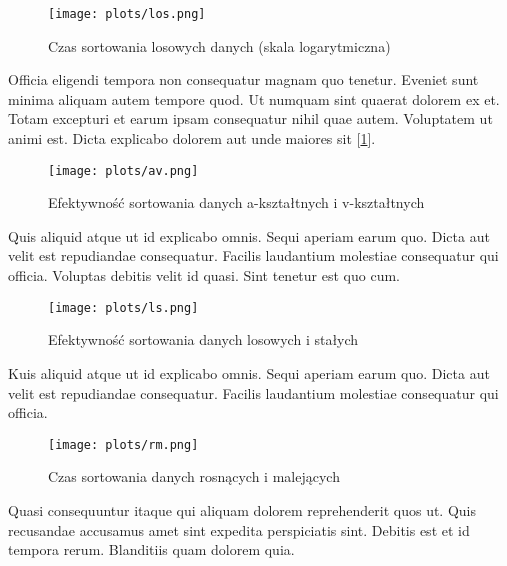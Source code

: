 \documentclass[10pt,twocolumn]{article}
\begin{document}
\begin{figure}
	\texttt{[image: plots/los.png]}
	\caption{Czas sortowania losowych danych (skala logarytmiczna) \label{los_log}}
\end{figure}

Officia eligendi tempora non consequatur magnam quo tenetur. Eveniet sunt minima aliquam autem tempore quod. Ut numquam sint quaerat dolorem ex et. Totam excepturi et earum ipsam consequatur nihil quae autem. Voluptatem ut animi est. Dicta explicabo dolorem aut unde maiores sit [\ref{los_log}].

\begin{figure}[h!]
	\texttt{[image: plots/av.png]}
	\caption{Efektywność sortowania danych a-kształtnych i v-kształtnych \label{aksz_vksz}}
\end{figure}

Quis aliquid atque ut id explicabo omnis. Sequi aperiam earum quo. Dicta aut velit est repudiandae consequatur. Facilis laudantium molestiae consequatur qui officia. Voluptas debitis velit id quasi. Sint tenetur est quo cum.

\begin{figure}[h!]
	\texttt{[image: plots/ls.png]}
	\caption{Efektywność sortowania danych losowych i stałych \label{los_sta}}
\end{figure}

Kuis aliquid atque ut id explicabo omnis. Sequi aperiam earum quo. Dicta aut velit est repudiandae consequatur. Facilis laudantium molestiae consequatur qui officia.

\begin{figure}[h!]
	\texttt{[image: plots/rm.png]}
	\caption{Czas sortowania danych rosnących i malejących \label{ros_mal}}
\end{figure}

Quasi consequuntur itaque qui aliquam dolorem reprehenderit quos ut. Quis recusandae accusamus amet sint expedita perspiciatis sint. Debitis est et id tempora rerum. Blanditiis quam dolorem quia.
\end{document}
